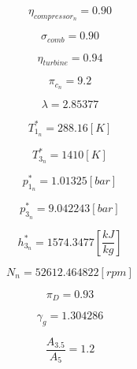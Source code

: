 \documentclass[titlepage]{article}
\begin{document}
  \begin{equation}
    \eta_{compressor_{n}} = 0.90
  \end{equation}
  
  \begin{equation}
    \sigma_{comb} = 0.90
  \end{equation}
  
  \begin{equation}
    \eta_{turbine} = 0.94
  \end{equation}
  
  \begin{equation}
    \pi_{c_{n}} = 9.2
  \end{equation}
  
  \begin{equation}
    \lambda = 2.85377
  \end{equation}
  
  \begin{equation}
    T_{1_{n}}^{*} = 288.16 [K]
  \end{equation}
  
  \begin{equation}
    T_{3_{n}}^{*} = 1410 [K]
  \end{equation}
  
  \begin{equation}
    p_{1_{n}}^{*} =  1.01325 [bar]
  \end{equation}
  
  \begin{equation}
    p_{3_{n}}^{*} =  9.042243 [bar]
  \end{equation}
  
  \begin{equation}
    h_{3_{n}}^{*} =  1574.3477 \left[\frac{kJ}{kg}\right]
  \end{equation}
  
  \begin{equation}
    N_{n} = 52612.464822 [rpm]
  \end{equation}
  
  \begin{equation}
    \pi_{D} = 0.93
  \end{equation}
  
  \begin{equation}
    \gamma_{g} = 1.304286
  \end{equation}
  
  \begin{equation}
    \frac{A_{3.5}}{A_{5}} = 1.2
  \end{equation}
  
\end{document}
